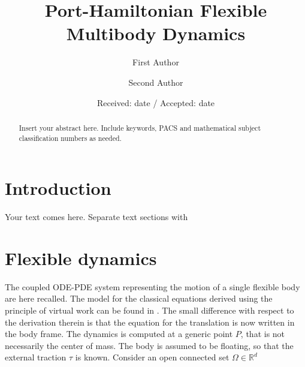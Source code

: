 \makeatletter \renewcommand\d[1]{\ensuremath{%
		\;\mathrm{d}#1\@ifnextchar\d{\!}{}}}
\makeatother



\title{Port-Hamiltonian Flexible Multibody Dynamics%
}
\subtitle{}


\author{First Author         \and
        Second Author %
}



\date{Received: date / Accepted: date}


\maketitle

\begin{abstract}
Insert your abstract here. Include keywords, PACS and mathematical
subject classification numbers as needed.
\end{abstract}

\section{Introduction}
\label{intro}
Your text comes here. Separate text sections with

\section{Flexible dynamics}

The coupled ODE-PDE system representing the motion of a single flexible body are here recalled. The model for the classical equations derived using the principle of virtual work can be found in \cite{MB_Daepde}. The small difference with respect to the derivation therein is that the equation for the translation is now written in the body frame. The dynamics is computed at a generic point $P$, that is not necessarily the center of mass. The body is assumed to be floating, so that the external traction $\tau$ is known. Consider an open connected set $\Omega \in \mathbb{R}^d$

